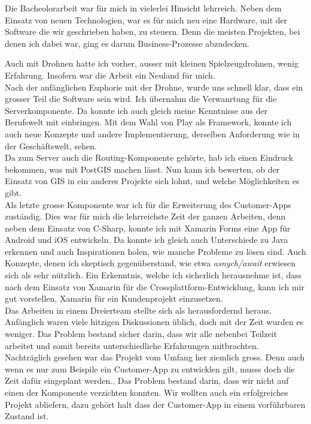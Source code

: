 Die Bacheolorarbeit war für mich in vielerlei Hinsicht lehrreich. 
Neben dem Einsatz von neuen Technologien, war es für mich neu eine Hardware, mit der Software die wir geschrieben haben, zu steuern.
Denn die meisten Projekten, bei denen ich dabei war, ging es darum Business-Prozesse abzudecken.

Auch mit Drohnen hatte ich vorher, ausser mit kleinen Spielzeugdrohnen, wenig Erfahrung. Insofern war die Arbeit ein Neuland für mich.
\\

Nach der anfänglichen Euphorie mit der Drohne, wurde uns schnell klar, dass ein grosser Teil die Software sein wird.
Ich übernahm die Verwanrtung für die Serverkomponente. Da konnte ich auch gleich meine Kenntnisse aus der Berufswelt mit einbringen.
Mit dem Wahl von Play als Framework, konnte ich auch neue Konzepte und andere Implementierung, derselben Anforderung wie in der Geschäftswelt, sehen. 
\\
Da zum Server auch die Routing-Komponente gehörte, hab ich einen Eindruck bekommen, was mit PostGIS machen lässt.
Nun kann ich bewerten, ob der Einsatz von GIS in ein anderes Projekte sich lohnt, und welche Möglichkeiten es gibt.
\\

Als letzte grosse Komponente war ich für die Erweiterung des Customer-Apps zuständig.
Dies war für mich die lehrreichste Zeit der ganzen Arbeiten, denn neben dem Einsatz von C-Sharp, konnte ich mit Xamarin Forms eine App für Android und iOS entwickeln.
Da konnte ich gleich auch Unterschiede zu Java erkennen und auch Inspirationen holen, wie manche Probleme zu lösen sind.
Auch Konzepte, denen ich skeptisch gegenüberstand, wie etwa \textit{asnych/await} erwiesen sich als sehr nützlich.
Ein Erkenntnis, welche ich sicherlich herausnehme ist, dass nach dem Einsatz von Xamarin für die Crossplattform-Entwicklung, kann ich mir gut vorstellen, Xamarin für ein Kundenprojekt einzusetzen.
\\

Das Arbeiten in einem Dreierteam stellte sich als herausfordernd heraus.
Anfänglich waren viele hitzigen Diskussionen üblich, doch mit der Zeit wurden es weniger. 
Das Problem bestand sicher darin, dass wir alle nebenbei Teilzeit arbeitet und somit bereits unterschiedliche Erfahrungen mitbrachten.  
\\

Nachträglich gesehen war das Projekt vom Umfang her ziemlich gross.
Denn auch wenn es nur zum Beispile ein Customer-App zu entwicklen gilt, musss doch die Zeit dafür eingeplant werden., 
Das Problem bestand darin, dass wir nicht auf einen der Komponente verzichten konnten.
Wir wollten auch ein erfolgreiches Projekt abliefern, dazu gehört halt dass der Customer-App in einem vorführbaren Zustand ist.
\\

